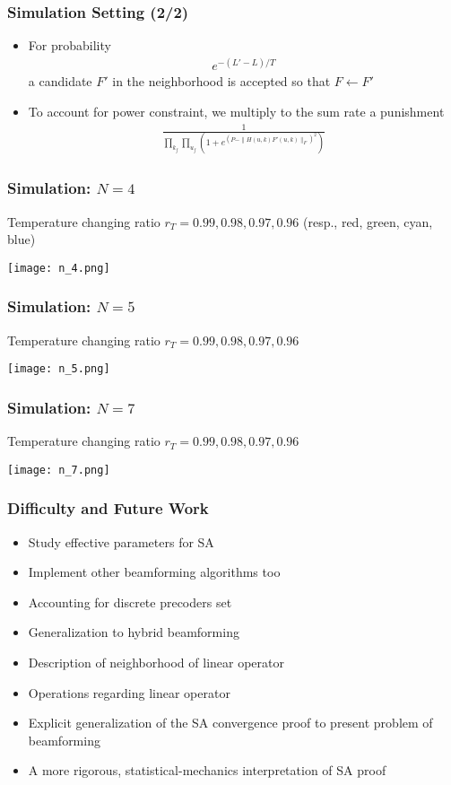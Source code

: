 \documentclass{beamer}
\begin{document}

\begin{frame}
	\frametitle{Simulation Setting (2/2)}
	\begin{itemize}
	\item For probability
	\begin{gather*}	
	e^{-(L'-L)/T}
	\end{gather*}
	a candidate \(F'\) in the neighborhood is accepted so that \(F \leftarrow F'\)
	\item To account for power constraint, we multiply to the sum rate a punishment
	\begin{gather*}
	\frac{1}{\prod_{k_f} \prod_{u_f} \left( 1 +e^{ (P-\|H(u,k) F'(u,k)\|_F)^2} \right) }
	\end{gather*}
	\end{itemize}
\end{frame}


\begin{frame}
	\frametitle{Simulation: \(N=4\)}
	Temperature changing ratio \(r_T =0.99, 0.98, 0.97, 0.96\) (resp., red, green, cyan, blue)
	\begin{center}
	\texttt{[image: n\_4.png]}
	\end{center}
\end{frame}

\begin{frame}
	\frametitle{Simulation: \(N=5\)}
	Temperature changing ratio \(r_T =0.99, 0.98, 0.97, 0.96\)
	\begin{center}
	\texttt{[image: n\_5.png]}
	\end{center}
\end{frame}


\begin{frame}
	\frametitle{Simulation: \(N=7\)}
	Temperature changing ratio \(r_T =0.99, 0.98, 0.97, 0.96\)
	\begin{center}
	\texttt{[image: n\_7.png]}
	\end{center}
\end{frame}


\begin{frame}
	\frametitle{Difficulty and Future Work}
	\begin{itemize}
\item Study effective parameters for SA
\item Implement other beamforming algorithms too
\item Accounting for discrete precoders set
\item Generalization to hybrid beamforming
\item Description of neighborhood of linear operator
\item Operations regarding linear operator
\item Explicit generalization of the SA convergence proof to present problem of beamforming
\item A more rigorous, statistical-mechanics interpretation of SA proof
	\end{itemize}
\end{frame}
\end{document}

